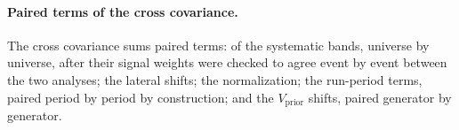 \paragraph{Paired terms of the cross covariance.} The cross covariance sums paired terms:  of the  systematic bands, universe by universe, after their signal weights were checked to agree event by event between the two analyses; the  lateral shifts; the normalization; the run-period terms, paired period by period by construction; and the $V_{\mathrm{prior}}$ shifts, paired generator by generator.

